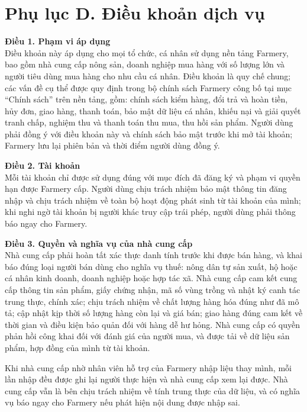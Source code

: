 
\section*{Phụ lục D. Điều khoản dịch vụ}

\noindent\textbf{Điều 1. Phạm vi áp dụng}\\
Điều khoản này áp dụng cho mọi tổ chức, cá nhân sử dụng nền tảng Farmery,
bao gồm nhà cung cấp nông sản, doanh nghiệp mua hàng với số lượng lớn và
người tiêu dùng mua hàng cho nhu cầu cá nhân. Điều khoản là quy chế chung;
các vấn đề cụ thể được quy định trong bộ chính sách Farmery công bố tại mục
``Chính sách'' trên nền tảng, gồm: chính sách kiểm hàng, đổi trả và hoàn
tiền, hủy đơn, giao hàng, thanh toán, bảo mật dữ liệu cá nhân, khiếu nại và
giải quyết tranh chấp, nghiệm thu và thanh toán thu mua, thu hồi sản phẩm.
Người dùng phải đồng ý với điều khoản này và chính sách bảo mật trước khi mở
tài khoản; Farmery lưu lại phiên bản và thời điểm người dùng đồng ý.

\noindent\textbf{Điều 2. Tài khoản}\\
Mỗi tài khoản chỉ được sử dụng đúng với mục đích đã đăng ký và phạm vi quyền
hạn được Farmery cấp. Người dùng chịu trách nhiệm bảo mật thông tin đăng
nhập và chịu trách nhiệm về toàn bộ hoạt động phát sinh từ tài khoản của
mình; khi nghi ngờ tài khoản bị người khác truy cập trái phép, người dùng
phải thông báo ngay cho Farmery.

\noindent\textbf{Điều 3. Quyền và nghĩa vụ của nhà cung cấp}\\
Nhà cung cấp phải hoàn tất xác thực danh tính trước khi được bán hàng, và
khai báo đúng loại người bán dùng cho nghĩa vụ thuế: nông dân tự sản xuất, hộ
hoặc cá nhân kinh doanh, doanh nghiệp hoặc hợp tác xã. Nhà cung cấp cam kết
cung cấp thông tin sản phẩm, giấy chứng nhận, mã số vùng trồng và nhật ký
canh tác trung thực, chính xác; chịu trách nhiệm về chất lượng hàng hóa đúng
như đã mô tả; cập nhật kịp thời số lượng hàng còn lại và giá bán; giao hàng
đúng cam kết về thời gian và điều kiện bảo quản đối với hàng dễ hư hỏng. Nhà
cung cấp có quyền phản hồi công khai đối với đánh giá của người mua, và được
tải về dữ liệu sản phẩm, hợp đồng của mình từ tài khoản.

Khi nhà cung cấp nhờ nhân viên hỗ trợ của Farmery nhập liệu thay mình, mỗi
lần nhập đều được ghi lại người thực hiện và nhà cung cấp xem lại được. Nhà
cung cấp vẫn là bên chịu trách nhiệm về tính trung thực của dữ liệu, và có
nghĩa vụ báo ngay cho Farmery nếu phát hiện nội dung được nhập sai.

